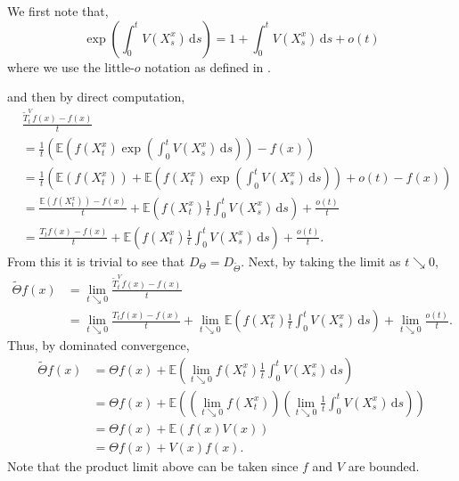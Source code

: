 \documentclass[a4paper,12pt,draft]{report}
\begin{document}
{
We first note that,
$$
\exp\left(\int_0^t V(X_s^x)\,\mathrm{d}s\right) = 1 + \int_0^t V(X_s^x)\,\mathrm{d}s + o(t)
$$
where we use the little-$o$ notation as defined in \cite{NGDB}.

and then by direct computation,
\begin{align}
& \frac{\tilde{T}_t^Vf(x) - f(x)}{t}\nonumber\\
& = \frac{1}{t}\left(\mathbb{E}\left(f(X_t^x)\exp\left(\int_0^t V(X_s^x)\,\mathrm{d}s\right)\right) - f(x)\right)\nonumber\\
& = \frac{1}{t}\left(\mathbb{E}(f(X_t^x)) + \mathbb{E}\left(f(X_t^x)\exp\left(\int_0^t V(X_s^x)\,\mathrm{d}s\right)\right) + o(t) - f(x)\right)\nonumber\\
& = \frac{\mathbb{E}(f(X_t^x)) - f(x)}{t} + \mathbb{E}\left(f(X_t^x)\frac{1}{t}\int_0^t V(X_s^x)\,\mathrm{d}s\right) + \frac{o(t)}{t}\nonumber\\
& = \frac{T_tf(x) - f(x)}{t} + \mathbb{E}\left(f(X_t^x)\frac{1}{t}\int_0^t V(X_s^x)\,\mathrm{d}s\right) + \frac{o(t)}{t}.\nonumber
\end{align}
From this it is trivial to see that $D_\Theta = D_{\tilde{\Theta}}$.  Next, by taking the limit as $t \searrow 0$,
\begin{align}
\tilde{\Theta} f(x) & = \lim_{t \searrow 0}\frac{\tilde{T}_t^Vf(x) - f(x)}{t}\nonumber\\
& = \lim_{t \searrow 0}\frac{T_tf(x) - f(x)}{t} + \lim_{t \searrow 0}\mathbb{E}\left(f(X_t^x)\frac{1}{t}\int_0^t V(X_s^x)\,\mathrm{d}s\right) + \lim_{t \searrow 0}\frac{o(t)}{t}.\nonumber
\end{align}
Thus, by dominated convergence,
\begin{align}
\tilde{\Theta} f(x) & = \Theta f(x) + \mathbb{E}\left(\lim_{t \searrow 0}f(X_t^x)\frac{1}{t}\int_0^t V(X_s^x)\,\mathrm{d}s\right)\nonumber\\
& = \Theta f(x) + \mathbb{E}\left(\left(\lim_{t \searrow 0}f(X_t^x)\right)\left(\lim_{t \searrow 0}\frac{1}{t}\int_0^t V(X_s^x)\,\mathrm{d}s\right)\right)\nonumber\\
& = \Theta f(x) + \mathbb{E}(f(x)V(x))\nonumber\\
& = \Theta f(x) + V(x)f(x).\nonumber
\end{align}
Note that the product limit above can be taken since $f$ and $V$ are bounded.

\qedhere
}
\end{document}
